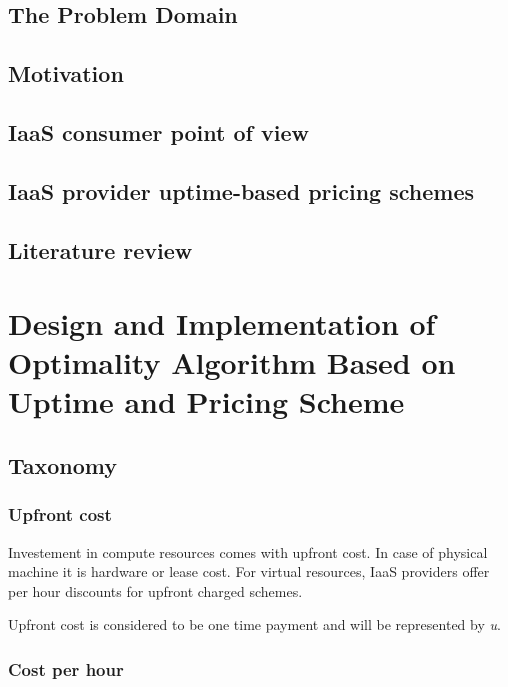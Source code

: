 \documentclass[]{final_report}
\begin{document}
\section{The Problem Domain}

\section{Motivation}

\section{IaaS consumer point of view}

\section{IaaS provider uptime-based pricing schemes}

\section{Literature review}



\chapter{Design and Implementation of Optimality Algorithm Based on Uptime and Pricing Scheme}

\section{Taxonomy}

\subsection{Upfront cost}

Investement in compute resources comes with upfront cost. In case of physical machine it is hardware or lease cost. For virtual resources, IaaS providers offer per hour discounts for upfront charged schemes. \par
Upfront cost is considered to be one time payment and will be represented by \textit{u}. 

\subsection{Cost per hour}
\end{document}
